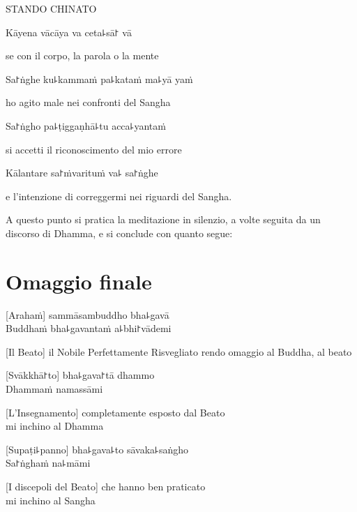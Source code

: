 \begin{instruction}
  STANDO CHINATO
\end{instruction}

Kāyena vācāya va ceta꜕sā꜓ vā\\
\begin{english}
se con il corpo, la parola o la mente \\
\end{english}
Sa꜓ṅghe ku꜕kammaṁ pa꜕kataṁ ma꜕yā yaṁ\\
\begin{english}
ho agito male nei confronti del Sangha\\
\end{english}
Sa꜓ṅgho pa꜕ṭiggaṇhā꜕tu acca꜕yantaṁ\\
\begin{english}
si accetti il riconoscimento del mio errore \\
\end{english}
Kālantare sa꜓ṁvarituṁ va꜕ sa꜓ṅghe
\begin{english}
  e l'intenzione di correggermi nei riguardi del Sangha.
\end{english}


\begin{instruction}
  A questo punto si pratica la meditazione in silenzio, a volte seguita da un discorso di Dhamma, e si conclude con quanto segue:
\end{instruction}

\chapter*{Omaggio finale}

\delegateSetUseNext

[Arahaṁ] sammāsambuddho bha꜕gavā\\
Buddhaṁ bha꜕gavantaṁ a꜕bhi꜓vādemi

\begin{english}
[Il Beato] il Nobile Perfettamente Risvegliato
rendo omaggio al Buddha, al beato\\ 
\end{english}

[Svākkhā꜓to] bha꜕gava꜓tā dhammo\\
Dhammaṁ namassāmi 
\begin{english}
[L'Insegnamento] completamente esposto dal Beato\\
mi inchino al Dhamma
\end{english}

[Supaṭi꜕panno] bha꜕gava꜕to sāvaka꜕saṅgho\\
Sa꜓ṅghaṁ na꜕māmi  
\begin{english}
 [I discepoli del Beato] che hanno ben praticato\\
mi inchino al Sangha
\end{english}

\clearpage

